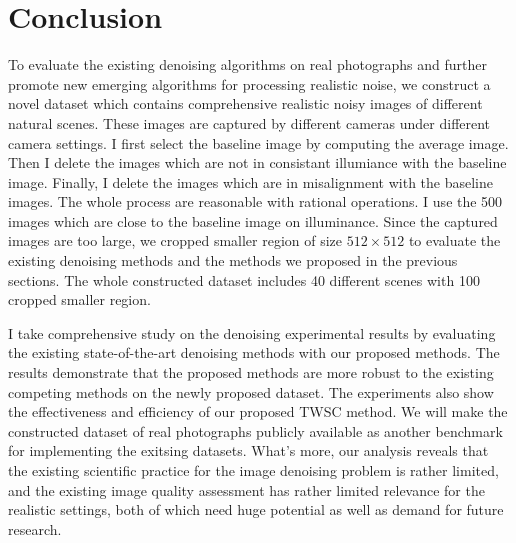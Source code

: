 \section{Conclusion}

To evaluate the existing denoising algorithms on real photographs and further promote new emerging algorithms for processing realistic noise, we construct a novel dataset which contains comprehensive realistic noisy images of different natural scenes. These images are captured by different cameras under different camera settings. I first select the baseline image by computing the average image. Then I delete the images which are not in consistant illumiance with the baseline image. Finally, I delete the images which are in misalignment with the baseline images. The whole process are reasonable with rational operations. I use the 500 images which are close to the baseline image on illuminance. Since the captured images are too large, we cropped smaller region of size $512\times512$ to evaluate the existing denoising methods and the methods we proposed in the previous sections. The whole constructed dataset includes 40 different scenes with 100 cropped smaller region.

I take comprehensive study on the denoising experimental results by evaluating the existing state-of-the-art denoising methods with our proposed methods. The results demonstrate that the proposed methods are more robust to the existing competing methods on the newly proposed dataset. The experiments also show the effectiveness and efficiency of our proposed TWSC method. We will make the constructed dataset of real photographs publicly available as another benchmark for implementing the exitsing datasets. What's more, our analysis reveals that the existing scientific practice for the image denoising problem is rather limited, and the existing image quality assessment has rather limited relevance for the realistic settings, both of which need huge potential as well as demand for future research.





















